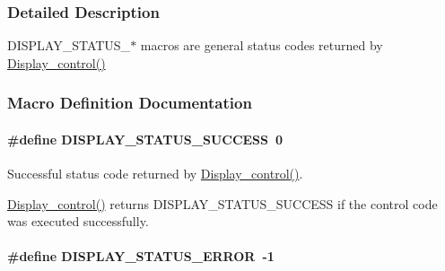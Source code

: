 \subsubsection{Detailed Description}
D\+I\+S\+P\+L\+A\+Y\+\_\+\+S\+T\+A\+T\+U\+S\+\_\+$\ast$ macros are general status codes returned by \hyperlink{_display_8h_ad623d21e3c6d821bf6f4bdcfa05ec21f}{Display\+\_\+control()} 

\subsubsection{Macro Definition Documentation}
\paragraph[{D\+I\+S\+P\+L\+A\+Y\+\_\+\+S\+T\+A\+T\+U\+S\+\_\+\+S\+U\+C\+C\+E\+S\+S}]{\setlength{\rightskip}{0pt plus 5cm}\#define D\+I\+S\+P\+L\+A\+Y\+\_\+\+S\+T\+A\+T\+U\+S\+\_\+\+S\+U\+C\+C\+E\+S\+S~0}\label{group___d_i_s_p_l_a_y___s_t_a_t_u_s_ga4f6a4a10f24cf55bc13d1750e38bb946}


Successful status code returned by \hyperlink{_display_8h_ad623d21e3c6d821bf6f4bdcfa05ec21f}{Display\+\_\+control()}. 

\hyperlink{_display_8h_ad623d21e3c6d821bf6f4bdcfa05ec21f}{Display\+\_\+control()} returns D\+I\+S\+P\+L\+A\+Y\+\_\+\+S\+T\+A\+T\+U\+S\+\_\+\+S\+U\+C\+C\+E\+S\+S if the control code was executed successfully. 
\paragraph[{D\+I\+S\+P\+L\+A\+Y\+\_\+\+S\+T\+A\+T\+U\+S\+\_\+\+E\+R\+R\+O\+R}]{\setlength{\rightskip}{0pt plus 5cm}\#define D\+I\+S\+P\+L\+A\+Y\+\_\+\+S\+T\+A\+T\+U\+S\+\_\+\+E\+R\+R\+O\+R~-\/1}\label{group___d_i_s_p_l_a_y___s_t_a_t_u_s_gaf91798b06dd95fce8063b7328420fab3}


